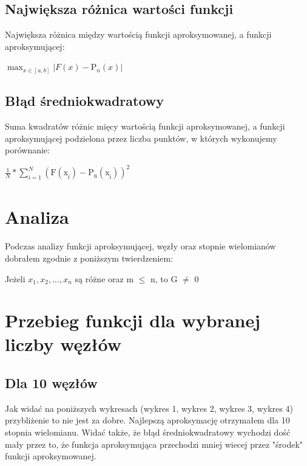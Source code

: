 \documentclass{article}
\begin{document}
\subsection{Największa różnica wartości funkcji}

Największa różnica między wartością funkcji aproksymowanej, a funkcji aproksymującej:

\begin{center}
    \(\max_{x\in [a, b]} |F(x) - \mathrm{P}_{n}^{}(x)|\)
\end{center}

\subsection{Błąd średniokwadratowy}

Suma kwadratów różnic mięcy wartością funkcji aproksymowanej, a funkcji aproksymującej podzielona przez liczba punktów, w których wykonujemy porównanie:

\begin{center}
\(\frac{1}{N} * \sum_{i = 1}^{N}\mathrm{(F(\mathrm{x}_{i}^{}) - \mathrm{P}_{n}^{}(\mathrm{x}_{i}^{}))}_{}^{2}\)
\end{center}

\section{Analiza}

Podczas analizy funkcji aproksymującej,
węzły oraz stopnie wielomianów dobrałem zgodnie z poniższym twierdzeniem:

\begin{center}
Jeżeli \(x_1, x_2, ...,x_n\) są różne oraz m \(\le \) n, to G \(\neq \) 0
\end{center}

\newpage

\section{Przebieg funkcji dla wybranej liczby węzłów}
\subsection{Dla 10 węzłów}

Jak widać na poniższych wykresach (wykres 1, wykres 2, wykres 3, wykres 4) przybliżenie to nie jest za dobre. Najlepszą aproksymację otrzymałem dla 10 stopnia wielomianu. Widać także, że błąd średniokwadratowy wychodzi dość mały przez to, że funkcja aproksymująca przechodzi mniej wiecej przez "środek" funkcji aproksymowanej.
\end{document}
